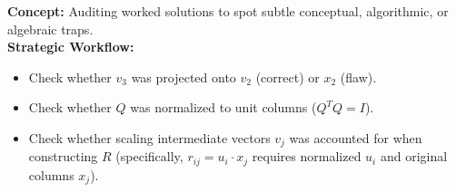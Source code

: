 \documentclass[11pt, letterpaper]{article}
\theoremstyle{definition}
\theoremstyle{remark}
\begin{document}
\begin{description}[leftmargin=1.5em, style=nextline]
    \item[Advanced Diagnostic Testing: ``Find the Flaw'' (Problems 28--30)]
    \textbf{Concept:} Auditing worked solutions to spot subtle conceptual, algorithmic, or algebraic traps.\\
    \textbf{Strategic Workflow:}
    \begin{itemize}
        \item Check whether $v_3$ was projected onto $v_2$ (correct) or $x_2$ (flaw).
        \item Check whether $Q$ was normalized to unit columns ($Q^T Q = I$).
        \item Check whether scaling intermediate vectors $v_j$ was accounted for when constructing $R$ (specifically, $r_{ij} = u_i \cdot x_j$ requires normalized $u_i$ and original columns $x_j$).
    \end{itemize}
\end{description}
\end{document}
